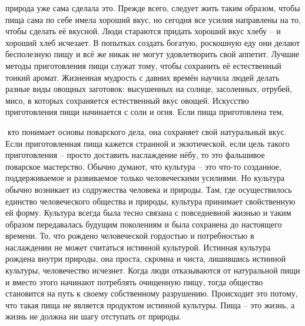 \documentclass[a4paper]{book}
\begin{document}
природа уже сама сделала это.
Прежде всего, следует жить таким образом, чтобы пища сама по себе имела хороший
вкус, но сегодня все усилия направлены на то, чтобы сделать её вкусной.
Люди стараются придать хороший вкус хлебу – и хороший хлеб исчезает. В попытках
создать богатую, роскошную еду они делают бесполезную пищу и всё же никак не могут
удовлетворить свой аппетит. Лучшие методы приготовления пищи служат тому, чтобы
сохранить её естественный тонкий аромат. Жизненная мудрость с давних времён научила
людей делать разные виды овощных заготовок: высушенных на солнце, засоленных, отрубей,
мисо, в которых сохраняется естественный вкус овощей.
Искусство приготовления пищи начинается с соли и огня. Если пища приготовлена тем,

кто понимает основы поварского дела, она сохраняет свой натуральный вкус. Если
приготовленная пища кажется странной и экзотической, если цель такого приготовления –
просто доставить наслаждение нёбу, то это фальшивое поварское мастерство.
Обычно думают, что культура – это что-то созданное, поддерживаемое и развиваемое
только человеческими усилиями. Но культура обычно возникает из содружества человека и
природы. Там, где осуществилось единство человеческого общества и природы, культура
принимает свойственную ей форму. Культура всегда была тесно связана с повседневной
жизнью и таким образом передавалась будущим поколениям и была сохранена до настоящего
времени.
То, что рождено человеческой гордостью и потребностью в наслаждении не может
считаться истинной культурой. Истинная культура рождена внутри природы, она проста,
скромна и чиста, лишившись истинной культуры, человечество исчезнет.
Когда люди отказываются от натуральной пищи и вместо этого начинают потреблять
очищенную пищу, тогда общество становится на путь к своему собственному разрушению.
Происходит это потому, что такая пища не является продуктом истинной культуры. Пища –
это жизнь, а жизнь не должна ни шагу отступать от природы.
\end{document}
